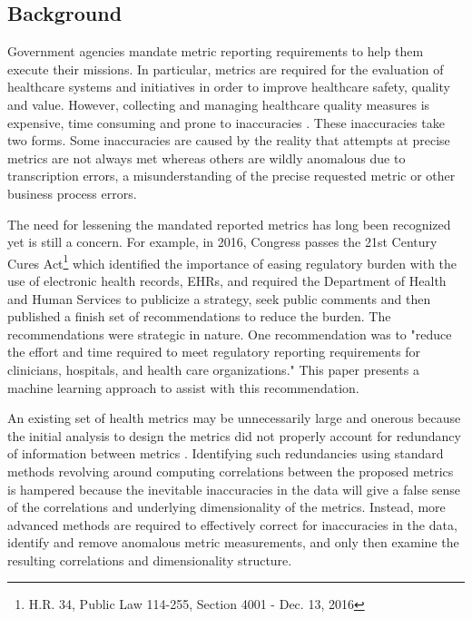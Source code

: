 \documentclass[conference]{IEEEtran}
\begin{document}
\subsection{Background}
Government agencies  mandate  metric reporting requirements to help them execute their missions.  In particular,  metrics are required for the evaluation of healthcare systems and initiatives in order to improve healthcare safety, quality and value. However, collecting and managing healthcare quality measures is expensive,  time consuming and prone to inaccuracies \cite{rao2017impact, cutler2012reducing}.  These inaccuracies take two forms.  Some inaccuracies are caused by the reality that attempts at precise metrics are not always met whereas others are wildly anomalous due to transcription errors, a misunderstanding of the precise requested metric or other business process errors.

The need for lessening the mandated reported metrics has long been recognized yet is still a concern.  For example, in 2016, Congress passes the  21st Century Cures Act\footnote{H.R. 34, Public Law 114-255, Section 4001 - Dec. 13, 2016} which identified the importance of easing regulatory burden with the use of electronic health records, EHRs, and required  the Department of Health and Human Services to publicize a strategy, seek public comments and then published a finish set of recommendations to reduce the burden. \cite{HHS2019str} The recommendations were strategic in nature. One recommendation was to "reduce the effort and time required to meet regulatory reporting requirements for clinicians, hospitals, and health care organizations."  This paper presents a machine learning approach to assist with this recommendation. 


An existing set of health metrics may be unnecessarily large and onerous because the initial analysis to design the metrics did not properly account for redundancy of information between metrics \cite{lesidea1, vostok2013assessment}.
Identifying such redundancies using standard methods revolving around computing correlations between the proposed metrics is hampered because the inevitable inaccuracies in the data will give a false sense of the correlations and underlying dimensionality of the metrics.   Instead, more advanced methods are required to effectively correct for  inaccuracies in the data, identify and remove anomalous metric measurements, and only then examine the resulting correlations and dimensionality structure.
\end{document}
